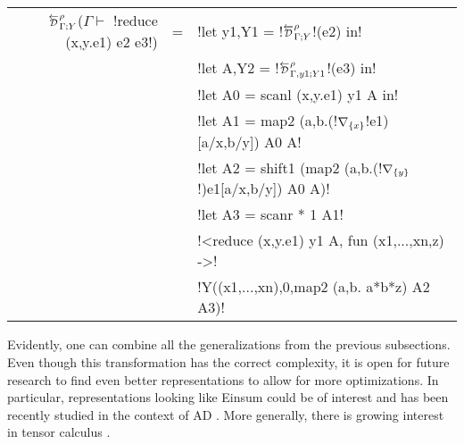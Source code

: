 \begin{center}
\begin{tabular}{r c l}
        $\directD{\rho}{\Gamma}{Y}$($\Gamma\vdash $ !reduce (x,y.e1) e2 e3!) 
        &=&  !let y1,Y1 = !$\directD{\rho}{\Gamma}{Y}$!(e2) in! \\
        && !let A,Y2 = !$\directD{\rho}{\Gamma,y1}{Y1}$!(e3) in! \\
        && !let A0 = scanl (x,y.e1) y1 A in! \\
        && !let A1 = map2 (a,b.(!$\nabla_{\{x\}}$!e1)[a/x,b/y]) A0 A! \\
        && !let A2 = shift1 (map2 (a,b.(!$\nabla_{\{y\}}$!)e1[a/x,b/y]) A0 A)! \\
        && !let A3 = scanr * 1 A1! \\
        && !<reduce (x,y.e1) y1 A, fun (x1,...,xn,z) ->! \\
        && !Y((x1,...,xn),0,map2 (a,b. a*b*z) A2 A3)!
\end{tabular}
\end{center}

Evidently, one can combine all the generalizations from the previous subsections.
Even though this transformation has the correct complexity, it is open for future research to find
even better representations to allow for more optimizations. 
In particular, representations looking like Einsum \cite{van2011numpy} could be of interest 
and has been recently studied in the context of AD \cite{laue2018computing,laue2020simple}.
More generally, there is growing interest in tensor calculus \cite{liao2019differentiable,bernstein2020differentiating}.
